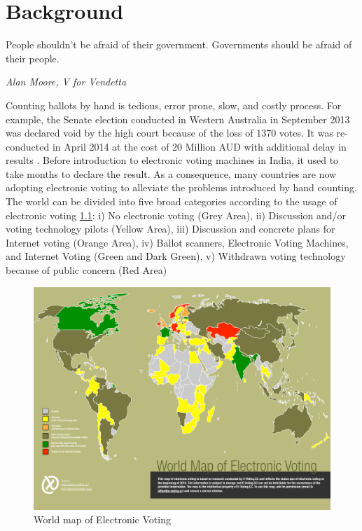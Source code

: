 \chapter{Background}
\label{cha:background}
\setlength{\parindent}{2em}
\setlength{\parskip}{1em}

\epigraph{People shouldn't be afraid of their government. Governments should be afraid of their people.} 
{\textit{Alan Moore, V for Vendetta }}
  Counting ballots by hand is tedious, error prone, slow, and costly process. 
  For example, the Senate election conducted in Western Australia in September 2013 was 
  declared void by the high court because of the loss of 1370 votes. It was 
  re-conducted in April 2014 at the cost of 20 Million 
  AUD with additional  delay in results \citep{Aussentate}. Before introduction to 
  electronic voting machines in India, it used to take months to declare the result.
  As a consequence, many countries 
  are now adopting electronic voting to alleviate the problems introduced by hand counting. 
  The world can be divided into five broad categories according to 
  the usage of electronic voting \citep{Evoting} \ref{fig:world_electronic_voting_map}: i) No electronic 
  voting (Grey Area), ii)
  Discussion and/or voting technology pilots (Yellow Area), 
  iii) Discussion and concrete plans for Internet voting (Orange Area),
  iv) Ballot scanners, Electronic Voting Machines, and Internet Voting (Green and Dark Green),
  v) Withdrawn voting technology because of public concern (Red Area) 
    \begin{figure}[!htb]
	\begin{center}
	\includegraphics[width=\textwidth,height=\textheight,keepaspectratio]{e-voting_worldmap_2015.pdf}
	\caption{World map of Electronic Voting}
	\label{fig:world_electronic_voting_map}
	\end{center}
  \end{figure}  
 
